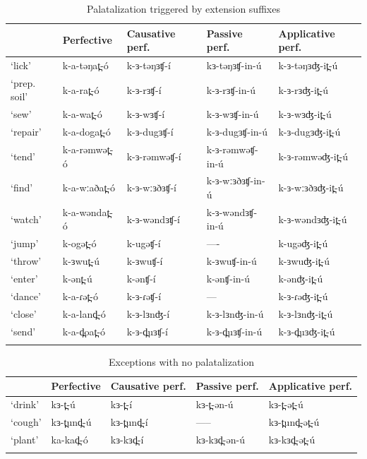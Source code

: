 \begin{table}
\begin{tabular}[t]{lllll}
\lsptoprule
&	Perfective	&	Causative perf.	&	Passive perf.	&	Applicative perf.\\
\midrule 
‘lick’	&	k-a-təŋat̪-ó	&	k-ɜ-təŋɜʧ-í	&	kɜ-təŋɜʧ-in-ú	&	k-ɜ-təŋɜʤ-it̪-ú\\
‘prep. soil’	&	k-a-rat̪-ó	&	k-ɜ-rɜʧ-í	&	k-ɜ-rɜʧ-in-ú	&	k-ɜ-rɜʤ-it̪-ú\\
‘sew’	&	k-a-wat̪-ó	&	k-ɜ-wɜʧ-í	&	k-ɜ-wɜʧ-in-ú	&	k-ɜ-wɜʤ-it̪-ú\\
‘repair’	&	k-a-dogat̪-ó	&	k-ɜ-dugɜʧ-í	&	k-ɜ-dugɜʧ-in-ú	&	k-ɜ-dugɜʤ-it̪-ú\\
‘tend’	&	k-a-rəmwət̪-ó	&	k-ɜ-rəmwəʧ-í	&	k-ɜ-rəmwəʧ-in-ú	&	k-ɜ-rəmwəʤ-it̪-ú\\
‘find’	&	k-a-wːaðat̪-ó	&	k-ɜ-wːɜðɜʧ-í	&	k-ɜ-wːɜðɜʧ-in-ú	&	k-ɜ-wːɜðɜʤ-it̪-ú\\
‘watch’	&	k-a-wəndat̪-ó	&	k-ɜ-wəndɜʧ-í	&	k-ɜ-wəndɜʧ-in-ú	&	k-ɜ-wəndɜʤ-it̪-ú\\
‘jump’	&	k-ogət̪-ó	&	k-ugəʧ-í	&	----		&	k-ugəʤ-it̪-ú\\
‘throw’	&	k-ɜwut̪-ú	&	k-ɜwuʧ-í	&	k-ɜwuʧ-in-ú	&	k-ɜwuʤ-it̪-ú\\
‘enter’	&	k-ənt̪-ú	&	k-ənʧ-í	&	k-ənʧ-in-ú	&	k-ənʤ-it̪-ú\\
‘dance’	&	k-a-ɾət̪-ó	&	k-ɜ-ɾəʧ-í	&	---	&	k-ɜ-ɾəʤ-it̪-ú\\
‘close’	&	k-a-land̪-ó	&	k-ɜ-lɜnʤ-í	&	k-ɜ-lɜnʤ-in-ú	&	k-ɜ-lɜnʤ-it̪-ú\\
‘send’	&	k-a-d̪oat̪-ó	&	k-ɜ-d̪uɜʧ-í	&	k-ɜ-d̪uɜʧ-in-ú	&	k-ɜ-d̪uɜʤ-it̪-ú\\
\lspbottomrule
\end{tabular}
\caption{Palatalization triggered by extension suffixes} \label{tab:ch5:pal}
\end{table}

\begin{table}
\caption{Exceptions with no palatalization}\label{tab:ch5:nopal}
\begin{tabular}[t]{lllll}
\lsptoprule
&	Perfective	&	Causative perf.	&	Passive perf.	&	Applicative perf.\\
\midrule
‘drink’	&	kɜ-t̪-ú	&	kɜ-t̪-í	&	kɜ-t̪-ən-ú	&	kɜ-t̪-ət̪-ú\\
‘cough’	&	kɜ-t̪und̪-ú	&	kɜ-t̪und̪-í	&	-----	&	kɜ-t̪und̪-ət̪-ú\\
‘plant’	&	ka-kad̪-ó	&	kɜ-kɜd̪-í	&	kɜ-kɜd̪-ən-ú	&	kɜ-kɜd̪-ət̪-ú\\
\lspbottomrule
\end{tabular}
\end{table}

